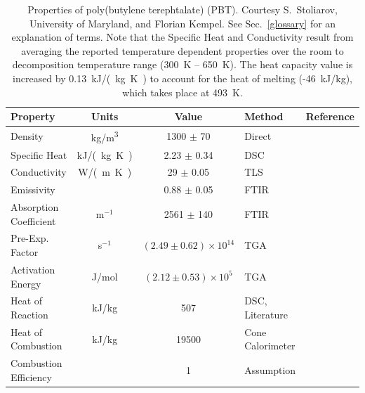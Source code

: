 \begin{table}[h!]
\caption[Properties of poly(butylene terephtalate) (PBT)]{Properties of poly(butylene terephtalate) (PBT). Courtesy S.~Stoliarov, University of Maryland, and
Florian Kempel.
See Sec.~\ref{glossary} for an explanation of terms. Note that the Specific Heat and Conductivity result from averaging the reported temperature dependent
properties over the room to decomposition temperature range (300~K -- 650~K).
The heat capacity value is increased by 0.13~\unit{kJ/(kg.K)} to account for the heat of melting (-46~kJ/kg), which takes place at 493~K.}
\begin{center}
\begin{tabular}{|l|c|c|l|l|}
\hline
Property                & Units     & Value                             & Method                                & Reference                     \\ \hline \hline
Density                 & \unit{kg/m^3}  & 1300 $\pm$ 70                     & Direct                                & \cite{Kempel:1}               \\ \hline
Specific Heat           & \unit{kJ/(kg.K)}   & 2.23 $\pm$ 0.34                   & DSC                                   & \cite{Kempel:1}               \\ \hline
Conductivity            & \unit{W/(m.K)} & 29 $\pm$ 0.05                   & TLS                                   & \cite{Kempel:1}               \\ \hline
Emissivity              &           & 0.88 $\pm$ 0.05                   & FTIR                                  & \cite{Linteris:2}             \\ \hline
Absorption Coefficient  & m$^{-1}$  & 2561 $\pm$ 140                    & FTIR                                  & \cite{Linteris:2}             \\ \hline
Pre-Exp. Factor         & s$^{-1}$  & $(2.49 \pm 0.62) \times 10^{14}$  & TGA                                   & \cite{Kempel:1}               \\ \hline
Activation Energy       & J/mol   & $(2.12 \pm 0.53) \times 10^{5}$   & TGA                                   & \cite{Kempel:1}               \\ \hline
Heat of Reaction        & kJ/kg     & 507                               & DSC, Literature                       & \cite{Kempel:1,Lyon:Ency2005} \\ \hline
Heat of Combustion      & kJ/kg     & 19500                             & Cone Calorimeter                      & \cite{Kempel:1}               \\ \hline
Combustion Efficiency   &           & 1                                 & Assumption                            & \cite{Kempel:1}               \\ \hline
\end{tabular}
\end{center}
\label{Properties_PBT}
\end{table}


